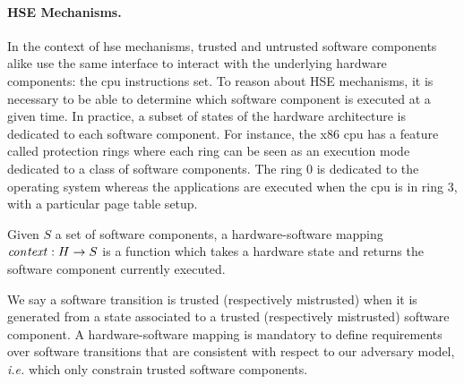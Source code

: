 \paragraph{HSE Mechanisms.}
%
In the context of \ac{hse} mechanisms, trusted and untrusted software components
alike use the same interface to interact with the underlying hardware
components: the \ac{cpu} instructions set.
%
To reason about HSE mechanisms, it is necessary to be able to determine which
software component is executed at a given time.
%
In practice, a subset of states of the hardware architecture is dedicated to
each software component.
%
For instance, the x86 \ac{cpu} has a feature called protection rings where each
ring can be seen as an execution mode dedicated to a class of software
components.
%
The ring 0 is dedicated to the operating system whereas the applications are
executed when the \ac{cpu} is in ring 3, with a particular page table setup.

\begin{definition}
  \label{def:speccert:hardsoft}
  Given $S$ a set of software components, a hardware-software mapping
  $\mathit{con\-text} : H \rightarrow S$ is a function which takes a hardware
  state and returns the software component currently executed.
\end{definition}

We say a software transition is trusted (respectively mistrusted) when it is
generated from a state associated to a trusted (respectively mistrusted)
software component.
%
A hardware-software mapping is mandatory to define requirements over software
transitions that are consistent with respect to our adversary model, \emph{i.e.}
which only constrain trusted software components.

